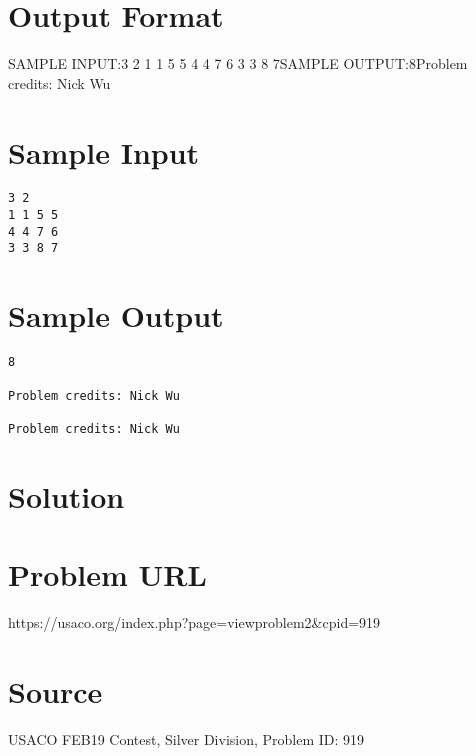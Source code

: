 \documentclass[12pt]{article}
\begin{document}
\section*{Output Format}
SAMPLE INPUT:3 2
1 1 5 5
4 4 7 6
3 3 8 7SAMPLE OUTPUT:8Problem credits: Nick Wu

\section*{Sample Input}
\begin{verbatim}
3 2
1 1 5 5
4 4 7 6
3 3 8 7
\end{verbatim}

\section*{Sample Output}
\begin{verbatim}
8

Problem credits: Nick Wu

Problem credits: Nick Wu
\end{verbatim}

\section*{Solution}


\section*{Problem URL}
https://usaco.org/index.php?page=viewproblem2&cpid=919

\section*{Source}
USACO FEB19 Contest, Silver Division, Problem ID: 919
\end{document}
